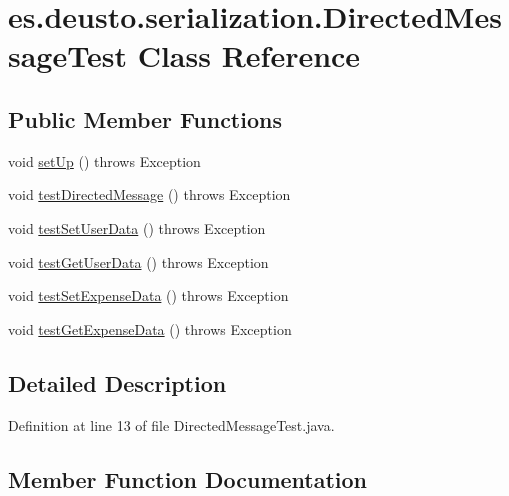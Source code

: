 \hypertarget{classes_1_1deusto_1_1serialization_1_1_directed_message_test}{}\section{es.\+deusto.\+serialization.\+Directed\+Message\+Test Class Reference}
\label{classes_1_1deusto_1_1serialization_1_1_directed_message_test}
\subsection*{Public Member Functions}
\begin{DoxyCompactItemize}
\item 
void \hyperlink{classes_1_1deusto_1_1serialization_1_1_directed_message_test_af63ee0427d30aaf340f96cabbcb8775e}{set\+Up} ()  throws Exception 
\item 
void \hyperlink{classes_1_1deusto_1_1serialization_1_1_directed_message_test_a704726ef8705632cb089bc25d8283b75}{test\+Directed\+Message} ()  throws Exception 
\item 
void \hyperlink{classes_1_1deusto_1_1serialization_1_1_directed_message_test_a91132b0ba7c7932be8b7dfded1e7e74a}{test\+Set\+User\+Data} ()  throws Exception 
\item 
void \hyperlink{classes_1_1deusto_1_1serialization_1_1_directed_message_test_a35a07f027c5c110942644ebe2ac429b9}{test\+Get\+User\+Data} ()  throws Exception 
\item 
void \hyperlink{classes_1_1deusto_1_1serialization_1_1_directed_message_test_abe0459a79b0888b65191c8662fdad324}{test\+Set\+Expense\+Data} ()  throws Exception 
\item 
void \hyperlink{classes_1_1deusto_1_1serialization_1_1_directed_message_test_a142287faad08832ef77c93c8e1ffe0b3}{test\+Get\+Expense\+Data} ()  throws Exception 
\end{DoxyCompactItemize}


\subsection{Detailed Description}


Definition at line 13 of file Directed\+Message\+Test.\+java.



\subsection{Member Function Documentation}
\mbox{\label{classes_1_1deusto_1_1serialization_1_1_directed_message_test_af63ee0427d30aaf340f96cabbcb8775e}} 
